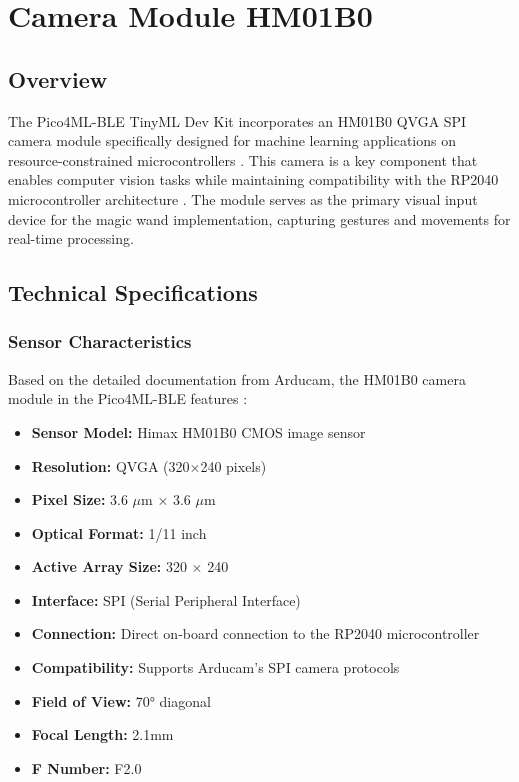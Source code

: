%
%


\chapter{Camera Module HM01B0}



\section{Overview}
The Pico4ML-BLE TinyML Dev Kit incorporates an HM01B0 QVGA SPI camera module specifically designed for machine learning applications on resource-constrained microcontrollers \cite{Arducam:2023, Himax:2019}. This camera is a key component that enables computer vision tasks while maintaining compatibility with the RP2040 microcontroller architecture \cite{RaspberryPi:2020a}. The module serves as the primary visual input device for the magic wand implementation, capturing gestures and movements for real-time processing.

\section{Technical Specifications}
\subsection{Sensor Characteristics}
Based on the detailed documentation from Arducam, the HM01B0 camera module in the Pico4ML-BLE features \cite{Himax:2019}:
\begin{itemize}
	\item \textbf{Sensor Model:} Himax HM01B0 CMOS image sensor
	\item \textbf{Resolution:} QVGA (320×240 pixels)
	\item \textbf{Pixel Size:} 3.6 $\mu$m × 3.6 $\mu$m
	\item \textbf{Optical Format:} 1/11 inch
	\item \textbf{Active Array Size:} 320 × 240
	\item \textbf{Interface:} SPI (Serial Peripheral Interface)
	\item \textbf{Connection:} Direct on-board connection to the RP2040 microcontroller
	\item \textbf{Compatibility:} Supports Arducam's SPI camera protocols \cite{Arducam:2023}
	\item \textbf{Field of View:} 70° diagonal
	\item \textbf{Focal Length:} 2.1mm
	\item \textbf{F Number:} F2.0
\end{itemize}

